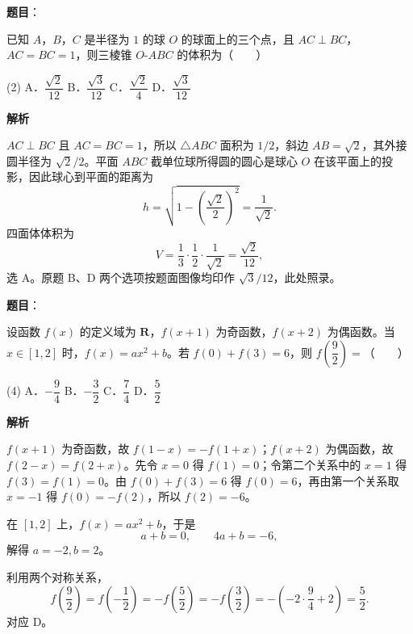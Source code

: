 \begin{answer}

\textbf{题目}：

已知 $A$，$B$，$C$ 是半径为 $1$ 的球 $O$ 的球面上的三个点，且 $AC\perp BC$，$AC=BC=1$，则三棱锥 $O\text{-}ABC$ 的体积为\mbox{（　　）}

\begin{gkopts}(2)
\task A．$\dfrac{\sqrt2}{12}$
\task B．$\dfrac{\sqrt3}{12}$
\task C．$\dfrac{\sqrt2}{4}$
\task D．$\dfrac{\sqrt3}{12}$
\end{gkopts}

\textbf{解析}

$AC\perp BC$ 且 $AC=BC=1$，所以 $\triangle ABC$ 面积为 $1/2$，斜边 $AB=\sqrt2$，其外接圆半径为 $\sqrt2/2$。平面 $ABC$ 截单位球所得圆的圆心是球心 $O$ 在该平面上的投影，因此球心到平面的距离为
\nopagebreak[4]
\[
h=\sqrt{1-\left(\frac{\sqrt2}{2}\right)^2}=\frac1{\sqrt2}.
\]
四面体体积为
\nopagebreak[4]
\[
V=\frac13\cdot\frac12\cdot\frac1{\sqrt2}=\frac{\sqrt2}{12},
\]
选 A。原题 B、D 两个选项按题面图像均印作 $\sqrt3/12$，此处照录。


\end{answer}
\begin{answer}

\textbf{题目}：

设函数 $f(x)$ 的定义域为 $\mathbf R$，$f(x+1)$ 为奇函数，$f(x+2)$ 为偶函数。当 $x\in[1,2]$ 时，$f(x)=ax^2+b$。若 $f(0)+f(3)=6$，则 $f\left(\dfrac92\right)=$\mbox{（　　）}

\begin{gkopts}(4)
\task A．$-\dfrac94$
\task B．$-\dfrac32$
\task C．$\dfrac74$
\task D．$\dfrac52$
\end{gkopts}

\textbf{解析}

$f(x+1)$ 为奇函数，故 $f(1-x)=-f(1+x)$；$f(x+2)$ 为偶函数，故 $f(2-x)=f(2+x)$。先令 $x=0$ 得 $f(1)=0$；令第二个关系中的 $x=1$ 得 $f(3)=f(1)=0$。由 $f(0)+f(3)=6$ 得 $f(0)=6$，再由第一个关系取 $x=-1$ 得 $f(0)=-f(2)$，所以 $f(2)=-6$。

在 $[1,2]$ 上，$f(x)=ax^2+b$，于是
\nopagebreak[4]
\[
a+b=0,\qquad 4a+b=-6,
\]
解得 $a=-2,b=2$。

利用两个对称关系，
\nopagebreak[4]
\[
f\left(\frac92\right)=f\left(-\frac12\right)
=-f\left(\frac52\right)=-f\left(\frac32\right)
=-\left(-2\cdot\frac94+2\right)=\frac52.
\]
对应 D。


\par\medskip

\end{answer}

